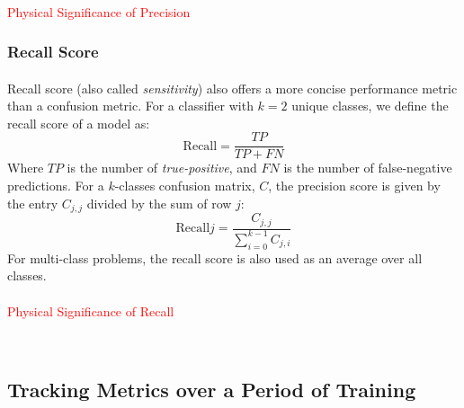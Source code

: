 \documentclass[12pt,letterpaper]{article}
\begin{document}
\paragraph*{}
\textcolor{red}{Physical Significance of Precision}


\subsubsection{Recall Score}

\paragraph*{}Recall score (also called \textit{sensitivity}) also offers a more concise performance metric than a confusion metric. For a classifier with $k = 2$ unique classes, we define the recall score of a model as:
\begin{equation}
\label{eqn-BinaryRecall}
\text{Recall} = \frac{TP}{TP + FN}
\end{equation}
Where $TP$ is the number of \textit{true-positive}, and $FN$ is the number of false-negative predictions. For a $k$-classes confusion matrix, $C$, the precision score is given by the entry $C_{j,j}$ divided by the sum of row $j$:
\begin{equation}
\label{eqn-KRecall}
\text{Recall}j = \frac{C_{j,j}}{\sum_{i=0}^{k-1}C_{j,i}}
\end{equation}
For multi-class problems, the recall score is also used as an average over all classes. 

\paragraph*{}
\textcolor{red}{Physical Significance of Recall}


\


\subsection{Tracking Metrics over a Period of Training}
\label{subsec-TrainingMetrics}




\end{document}
